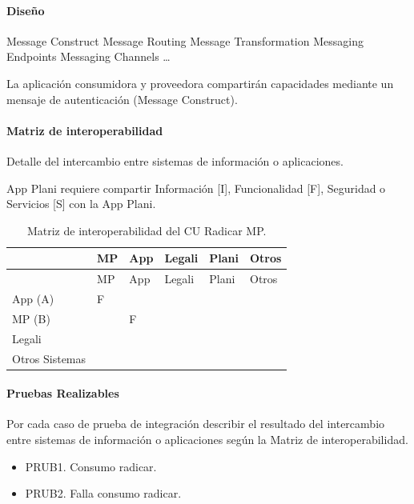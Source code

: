 \documentclass[
  paper=a4,
  ,captions=tableheading
]{scrartcl}
\providecommand{\tightlist}{%
  \setlength{\itemsep}{0pt}\setlength{\parskip}{0pt}}
\begin{document}
\paragraph{Diseño}\label{sec:diseuxf1o-1}

Message Construct \textbar{} Message Routing \textbar{} Message
Transformation \textbar{} Messaging Endpoints \textbar{} Messaging
Channels \textbar{} \ldots{}

La aplicación consumidora y proveedora compartirán capacidades mediante
un mensaje de autenticación (Message Construct).

\paragraph{Matriz de
interoperabilidad}\label{sec:matriz-de-interoperabilidad-1}

Detalle del intercambio entre sistemas de información o aplicaciones.

App Plani requiere compartir Información {[}I{]}, Funcionalidad {[}F{]},
Seguridad o Servicios {[}S{]} con la App Plani.

\begin{longtable}[]{@{}llllll@{}}
\caption{Matriz de interoperabilidad del CU Radicar MP.}\tabularnewline
\toprule\noalign{}
& MP & App & Legali & Plani & Otros \\
\midrule\noalign{}
\endfirsthead
\toprule\noalign{}
& MP & App & Legali & Plani & Otros \\
\midrule\noalign{}
\endhead
\bottomrule\noalign{}
\endlastfoot
App (A) & F & & & & \\
MP (B) & & F & & & \\
Legali & & & & & \\
Otros Sistemas & & & & & \\
\end{longtable}

\paragraph{Pruebas Realizables}\label{sec:pruebas-realizables-1}

Por cada caso de prueba de integración describir el resultado del
intercambio entre sistemas de información o aplicaciones según la Matriz
de interoperabilidad.

\begin{itemize}
\tightlist
\item
  PRUB1. Consumo radicar.
\item
  PRUB2. Falla consumo radicar.
\end{itemize}
\end{document}
